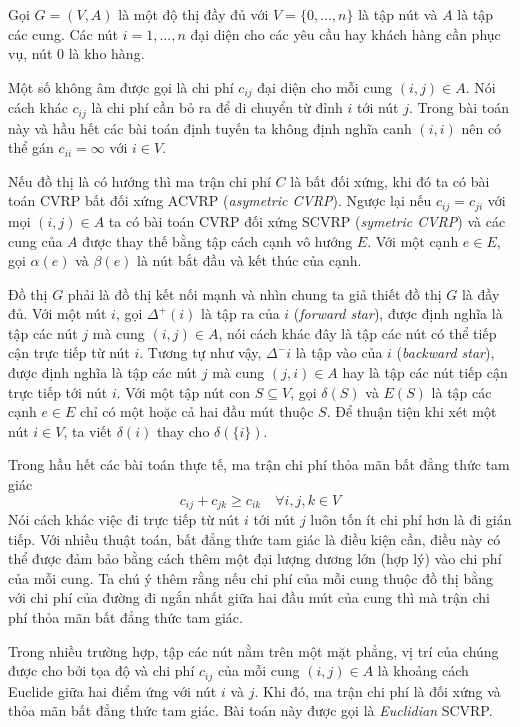 Gọi $G=(V,A)$ là một độ thị đầy đủ với $V=\{ 0, ..., n \}$ là tập nút và $A$ là tập các cung. Các nút $i=1,...,n$ đại diện cho các yêu cầu hay khách hàng cần phục vụ, nút $0$ là kho hàng. 

Một số không âm được gọi là chi phí $c_{ij}$ đại diện cho mỗi cung $(i,j) \in A$. Nói cách khác $c_{ij}$ là  chi phí cần bỏ ra để di chuyển từ đỉnh $i$ tới nút $j$. Trong bài toán này và hầu hết các bài toán định tuyến ta không định nghĩa canh $(i,i)$ nên có thể gán $c_{ii} = \infty$ với $i \in V$.

Nếu đồ thị là có hướng thì ma trận chi phí $C$ là bất đối xứng, khi đó ta có bài toán CVRP bất đối xứng ACVRP (\textit{asymetric CVRP}). Ngược lại nếu $c_{ij} = c_{ji}$ với mọi $(i,j) \in A$ ta có bài toán CVRP đối xứng SCVRP (\textit{symetric CVRP}) và các cung của $A$ được thay thế bằng tập cách cạnh vô hướng $E$. Với một cạnh $e \in E$, gọi $\alpha(e)$ và $\beta(e)$ là nút bắt đầu và kết thúc của cạnh. 

Đồ thị $G$ phải là đồ thị kết nối mạnh và nhìn chung ta giả thiết đồ thị $G$ là đầy đủ. Với một nút $i$, gọi $\Delta^+(i)$ là tập ra của $i$ (\textit{forward star}), được định nghĩa là tập các nút $j$ mà cung $(i,j) \in A$, nói cách khác đây là tập các nút có thể tiếp cận trực tiếp từ nút $i$. Tương tự như vậy, $\Delta^-{i}$ là tập vào của $i$ (\textit{backward star}), được định nghĩa là tập các nút $j$ mà cung $(j,i) \in A$ hay là tập các nút tiếp cận trực tiếp tới nút $i$. Với một tập nút con $S \subseteq V$, gọi $\delta(S)$ và $E(S)$ là tập các cạnh $e \in E$ chỉ có một hoặc cả hai đầu mút thuộc $S$. Để thuận tiện khi xét một nút $i \in V$, ta viết $\delta(i)$ thay cho $\delta(\{i\})$.

Trong hầu hết các bài toán thực tế, ma trận chi phí thỏa mãn bất đẳng thức tam giác 
\begin{equation}
    c_{ij} + c_{jk} \geq c_{ik} \quad \forall i,j,k \in V
\end{equation}
Nói cách khác việc đi trực tiếp từ nút $i$ tới nút $j$ luôn tốn ít chi phí hơn là đi gián tiếp. Với nhiều thuật toán, bất đẳng thức tam giác là điều kiện cần, điều này có thể được đảm bảo bằng cách thêm một đại lượng dương lớn (hợp lý) vào chi phí của mỗi cung. Ta chú ý thêm rằng nếu chi phí của mỗi cung thuộc đồ thị bằng với chi phí của đường đi ngắn nhất giữa hai đầu mút của cung thì mà trận chi phí thỏa mãn bất đẳng thức tam giác.

Trong nhiều trường hợp, tập các nút nằm trên một mặt phẳng, vị trí của chúng được cho bởi tọa độ và chi phí $c_{ij}$ của mỗi cung $(i,j) \in A$ là khoảng cách Euclide giữa hai điểm ứng với nút $i$ và $j$. Khi đó, ma trận chi phí là đối xứng và thỏa mãn bất đẳng thức tam giác. Bài toán này được gọi là \textit{Euclidian} SCVRP.

